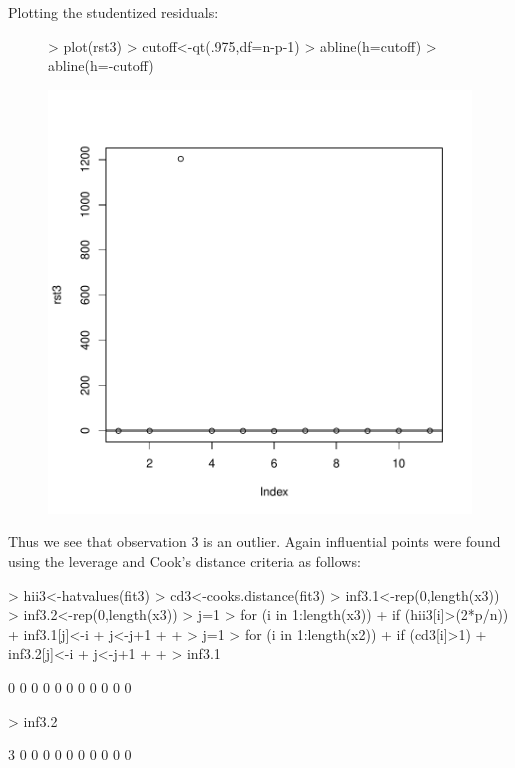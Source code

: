 \documentclass[12pt]{article}
\begin{document}
\begin{itemize}
Plotting the studentized residuals:
\begin{figure}[H]
\begin{Schunk}
\begin{Sinput}
> plot(rst3)
> cutoff<-qt(.975,df=n-p-1)
> abline(h=cutoff)
> abline(h=-cutoff)
\end{Sinput}
\end{Schunk}
\includegraphics{HW6-022}
\end{figure}
\clearpage

Thus we see that observation 3 is an outlier. Again influential points were found using the leverage and Cook's distance criteria as follows:

\begin{Schunk}
\begin{Sinput}
> hii3<-hatvalues(fit3)
> cd3<-cooks.distance(fit3)
> inf3.1<-rep(0,length(x3))
> inf3.2<-rep(0,length(x3))
> j=1
> for (i in 1:length(x3)){
+   if (hii3[i]>(2*p/n)){
+     inf3.1[j]<-i
+     j<-j+1
+   }
+ }
> j=1
> for (i in 1:length(x2)){
+   if (cd3[i]>1){
+     inf3.2[j]<-i
+     j<-j+1
+   }
+ }
> inf3.1
\end{Sinput}
\begin{Soutput}
 [1] 0 0 0 0 0 0 0 0 0 0 0
\end{Soutput}
\begin{Sinput}
> inf3.2
\end{Sinput}
\begin{Soutput}
 [1] 3 0 0 0 0 0 0 0 0 0 0
\end{Soutput}
\end{Schunk}
\clearpage


\end{itemize}
\end{document}
